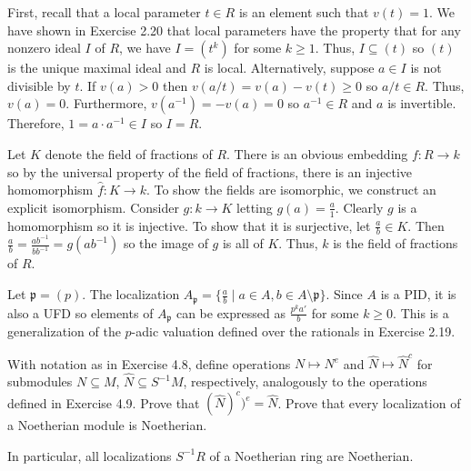 \documentclass[../../master.tex]{subfiles}
\begin{document}
    \begin{solution}
        First, recall that a local parameter $t \in R$ is an element such that
        $v(t) = 1$. We have shown in Exercise 2.20 that local parameters have
        the property that for any nonzero ideal $I$ of $R$, we have $I =
        (t^{k})$ for some $k \geq 1$. Thus, $I \subseteq (t)$ so $(t)$ is the
        unique maximal ideal and $R$ is local. Alternatively, suppose $a \in I$
        is not divisible by $t$. If $v(a) > 0$ then $v(a / t) = v(a) - v(t) \geq
        0$ so $a / t \in R$. Thus, $v(a) = 0$. Furthermore, $v(a^{-1}) = -v(a) =
        0$ so $a^{-1} \in R$ and $a$ is invertible. Therefore, $1 = a \cdot
        a^{-1} \in I$ so $I = R$.

        Let $K$ denote the field of fractions of $R$. There is an obvious
        embedding $f: R \to k$ so by the universal property of the field of
        fractions, there is an injective homomorphism $\hat{f}: K \to k$. To show the
        fields are isomorphic, we construct an explicit isomorphism. Consider
        $g: k \to K$ letting $g(a) = \frac{a}{1}$. Clearly $g$ is a homomorphism
        so it is injective. To show that it is surjective, let $\frac{a}{b} \in
        K$. Then $\frac{a}{b} = \frac{ab^{-1}}{b b^{-1}} = g(ab^{-1})$ so the
        image of $g$ is all of $K$. Thus, $k$ is the field of fractions of $R$.

        Let $\mathfrak{p} = (p)$. The localization $A_{\mathfrak{p}} = \{
        \frac{a}{b} \mid a \in A, b \in A \setminus \mathfrak{p}\}$. Since $A$
        is a PID, it is also a UFD so elements of $A_{\mathfrak{p}}$ can be
        expressed as $\frac{p^{k}a'}{b}$ for some $k \geq 0$. This is a
        generalization of the $p$-adic valuation defined over the rationals in
        Exercise 2.19.
    \end{solution}

    \begin{problem}
        With notation as in Exercise 4.8, define operations $N \mapsto N^{e}$
        and $\hat{N} \mapsto \hat{N}^{c}$ for submodules $N \subseteq M$,
        $\hat{N} \subseteq S^{-1}M$, respectively, analogously to the operations
        defined in Exercise 4.9. Prove that $(\hat{N})^{c})^{e} = \hat{N}$.
        Prove that every localization of a Noetherian module is Noetherian.

        In particular, all localizations $S^{-1}R$ of a Noetherian ring are
        Noetherian.
    \end{problem}
\end{document}
